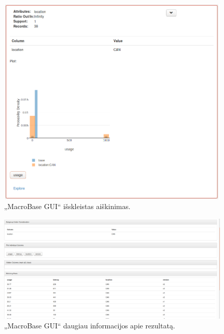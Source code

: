 \documentclass{VUMIFPSkursinis}
\begin{document}
\begin{figure}[H]
    \centering
    \includegraphics[scale=0.5]{img/expand}
    \caption{„MacroBase GUI“ išskleistas aiškinimas.}
    \label{img:expand}
\end{figure}

\begin{figure}[H]
    \centering
    \includegraphics[scale=0.25]{img/explore}
    \caption{„MacroBase GUI“ daugiau informacijos apie rezultatą.}
    \label{img:explore}
\end{figure}
\end{document}
